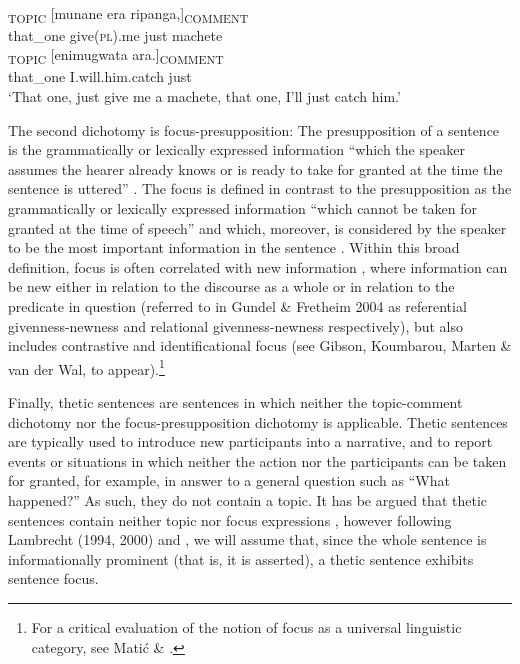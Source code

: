 \documentclass[output=paper]{langsci/langscibook}
\begin{document}
\ea\label{ex:}
\\
\gll [Oyo]\textsubscript{TOPIC} [munane era ripanga,]\textsubscript{COMMENT}\\
that\_one give(\textsc{pl}).me just machete \\


\gll [oyo]\textsubscript{TOPIC} [enimugwata ara.]\textsubscript{COMMENT}\\
that\_one I.will.him.catch just \\


\glt \textup{‘}\textup{That one, just give me a machete, that one, I’ll just catch him.’}
\z

The second dichotomy is focus-presupposition: The presupposition of a sentence is the grammatically or lexically expressed information “which the speaker assumes the hearer already knows or is ready to take for granted at the time the sentence is uttered” \citep[52]{Lambrecht1994}. The focus is defined in contrast to the presupposition as the grammatically or lexically expressed information “which cannot be taken for granted at the time of speech” \citep[207]{Lambrecht1994} and which, moreover, is considered by the speaker to be the most important information in the sentence \citep[277]{Dik1989}. Within this broad definition, focus is often correlated with new information \citep[39]{Good2010}, where information can be new either in relation to the discourse as a whole or in relation to the predicate in question (referred to in Gundel \& Fretheim 2004 as referential givenness-newness and relational givenness-newness respectively), but also includes contrastive and identificational focus (see Gibson, Koumbarou, Marten \& van der Wal, to appear).\footnote{For a critical evaluation of the notion of focus as a universal linguistic category, see Matić \& \citet{Wedgwood2013}.}

Finally, thetic sentences are sentences in which neither the topic-comment dichotomy nor the focus-presupposition dichotomy is applicable. Thetic sentences are typically used to introduce new participants into a narrative, and to report events or situations in which neither the action nor the participants can be taken for granted, for example, in answer to a general question such as “What happened?” As such, they do not contain a topic. It has be argued that thetic sentences contain neither topic nor focus expressions \citep[755]{Yoneda2011}, however following Lambrecht (1994, 2000) and \citet[55]{Nicolle2015b}, we will assume that, since the whole sentence is informationally prominent (that is, it is asserted), a thetic sentence exhibits sentence focus.
\end{document}
